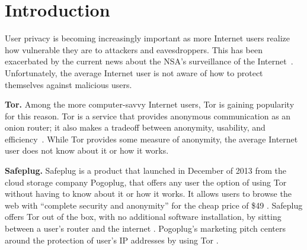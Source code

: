 \section{Introduction}
\label{sec:intro}

User privacy is becoming increasingly important as more Internet users realize how vulnerable they are to attackers and eavesdroppers.  This has been exacerbated by the current news about the NSA's surveillance of the Internet~\cite{nsa}.  Unfortunately, the average Internet user is not aware of how to protect themselves against malicious users.     

{\bf Tor.} Among the more computer-savvy Internet users, Tor is gaining popularity for this reason.  Tor is a service that provides anonymous communication as an onion router; it also makes a tradeoff between anonymity, usability, and efficiency~\cite{tor}.  While Tor provides some measure of anonymity, the average Internet user does not know about it or how it works.  

{\bf Safeplug.} Safeplug is a product that launched in December of 2013 from the cloud storage company Pogoplug, that offers any user the option of using Tor without having to know about it or how it works.  It allows users to browse the web with “complete security and anonymity” for the cheap price of \$49 \cite{safeplug}.  Safeplug offers Tor out of the box, with no additional software installation, by sitting between a user’s router and the internet \cite{wired}.  Pogoplug’s marketing pitch centers around the protection of user’s IP addresses by using Tor \cite{safeplug,bittech}.
